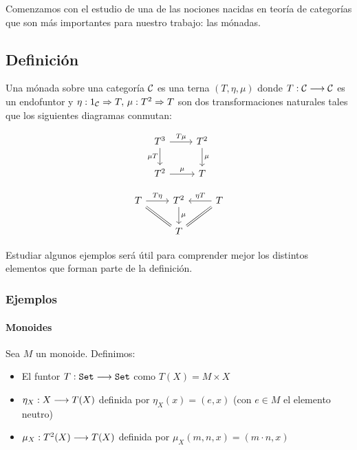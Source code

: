 Comenzamos con el estudio de una de las nociones nacidas
en teoría de categorías que son
más importantes para nuestro trabajo: las mónadas.


\subsection{Definición}
\begin{definition}
  Una mónada sobre una categoría $\mathcal{C}$
  es una terna $(T, \eta, \mu)$ donde $T : \mathcal{C}\longrightarrow \mathcal{C}$ es un
  endofuntor y $\eta : 1_{\mathcal{C}}\Rightarrow T, \, \mu: T^2\Rightarrow T$ son dos
  transformaciones naturales tales que los siguientes diagramas
  conmutan:
  \begin{center}
    \begin{equation}\label{diagrama:mu}
    \begin{tikzcd}
      T^3 \arrow{d}[swap]{\mu T} \arrow{r}{T\mu} & T^2 \arrow{d}{\mu} \\
      T^2 \arrow{r}{\mu} & T
    \end{tikzcd}
    \end{equation}

    \begin{equation}\label{diagrama:eta}
      \begin{tikzcd}
        T \ar[equal]{dr} \arrow{r}{T\eta} & T^2 \arrow{d}{\mu} & T \arrow{l}[swap]{\eta T} \ar[equal]{ld} \\
        & T &
      \end{tikzcd}
    \end{equation}
  \end{center}
\end{definition}
Estudiar algunos ejemplos será útil para comprender mejor
los distintos elementos que forman parte
de la definición.

\subsubsection{Ejemplos}
\paragraph{Monoides}
Sea $M$ un monoide. Definimos:
\begin{itemize}
\item El funtor $T : \texttt{Set}\longrightarrow \texttt{Set}$
  como $T(X) = M\times X$
\item $\eta_X : X\longrightarrow T(X)$ definida
por $\eta_X(x) = (e, x)$ (con $e \in M$ el elemento neutro)
\item $\mu_X : T^2(X)\longrightarrow T(X)$ definida por
$\mu_X(m, n, x) = (m\cdot n, x)$
\end{itemize}


